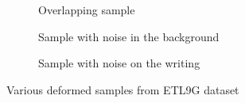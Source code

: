 \documentclass{article}
\begin{document}
\begin{CJK*}{UTF8}{min}
\begin{figure}[h]
    \centering
    \begin{subfigure}[t]{0.21\textwidth}
        \caption{Overlapping sample}
        \label{fig:overlap_sample}
    \end{subfigure}%
    \begin{subfigure}[t]{0.21\textwidth}
        \caption{Sample with noise in the background}
        \label{fig:noisy_sample}
    \end{subfigure}
    \begin{subfigure}[t]{0.21\textwidth}
        \caption{Sample with noise on the writing}
        \label{fig:noisy_sample2}
    \end{subfigure}
    \caption{Various deformed samples from ETL9G dataset}
    \label{fig:image_samples}
\end{figure}
\begin{figure}
    \centering
    \begin{subfigure}[t]{0.2\textwidth}

\end{subfigure}
\end{figure}
\end{CJK*}
\end{document}
